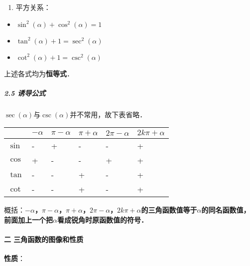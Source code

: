 \documentclass[
]{article}
\begin{document}
\begin{enumerate}
\def\labelenumi{\arabic{enumi}.}
\item
  平方关系：
\end{enumerate}

\begin{itemize}
\item
  \(\sin^2(\alpha) + \cos^2(\alpha) = 1\)
\item
  \(\tan^2(\alpha) + 1 = \sec^2(\alpha)\)
\item
  \(\cot^2(\alpha) + 1 = \csc^2(\alpha)\)
\end{itemize}

上述各式均为\textbf{恒等式}．

\hypertarget{25--ux8bf1ux5bfcux516cux5f0f}{%
\subparagraph{2.5 诱导公式}\label{25--ux8bf1ux5bfcux516cux5f0f}}

\(\sec(\alpha)\)与\(\csc(\alpha)\)并不常用，故下表省略．

\begin{longtable}[]{@{}llllll@{}}
\toprule
& \(-\alpha\) & \(\pi - \alpha\) & \(\pi + \alpha\) & \(2\pi - \alpha\)
& \(2k\pi + \alpha\) \\
\midrule
\endhead
\(\sin\) & - & + & - & - & + \\
\(\cos\) & + & - & - & + & + \\
\(\tan\) & - & - & + & - & + \\
\(\cot\) & - & - & + & - & + \\
\bottomrule
\end{longtable}

概括：\textbf{\(-\alpha\)，\(\pi - \alpha\)，\(\pi + \alpha\)，\(2\pi - \alpha\)，\(2k\pi + \alpha\)的三角函数值等于\(\alpha\)的同名函数值，前面加上一个把\(\alpha\)看成锐角时原函数值的符号．}

\hypertarget{ux4e8c--ux4e09ux89d2ux51fdux6570ux7684ux56feux50cfux548cux6027ux8d28}{%
\paragraph{二
三角函数的图像和性质}\label{ux4e8c--ux4e09ux89d2ux51fdux6570ux7684ux56feux50cfux548cux6027ux8d28}}

\textbf{性质}：
\end{document}
